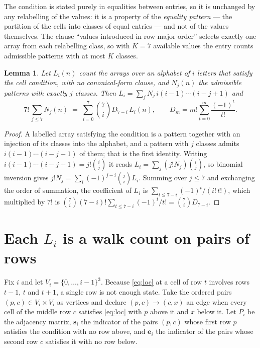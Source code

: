 \documentclass[11pt,a4paper]{article}
\theoremstyle{plain}
\newtheorem{lemma}[theorem]{Lemma}
\theoremstyle{definition}
\begin{document}
The condition is stated purely in equalities between entries, so it is unchanged by any
relabelling of the values: it is a property of the \emph{equality pattern} --- the partition
of the cells into classes of equal entries --- and not of the values themselves. The clause
``values introduced in row major order'' selects exactly one array from each relabelling
class, so with $K=7$ available values the entry counts admissible patterns with at most $K$
classes.

\begin{lemma}\label{lem:inv}
Let $L_i(n)$ count the arrays over an alphabet of $i$ letters that satisfy the cell
condition, with no canonical-form clause, and $N_j(n)$ the admissible patterns with exactly
$j$ classes. Then $L_i=\sum_j N_j\,i(i-1)\cdots(i-j+1)$ and
\[
7!\,\sum_{j\le 7}N_j(n)\;=\;\sum_{i=0}^{7}\binom{7}{i}D_{7-i}\,L_i(n),
\qquad D_m=m!\sum_{t=0}^{m}\frac{(-1)^t}{t!} .
\]
\end{lemma}

\begin{proof}
A labelled array satisfying the condition is a pattern together with an injection of its
classes into the alphabet, and a pattern with $j$ classes admits $i(i-1)\cdots(i-j+1)$ of
them; that is the first identity. Writing $i(i-1)\cdots(i-j+1)=j!\binom{i}{j}$ it reads
$L_i=\sum_j(j!N_j)\binom{i}{j}$, so binomial inversion gives
$j!N_j=\sum_i(-1)^{j-i}\binom{j}{i}L_i$. Summing over $j\le7$ and exchanging the
order of summation, the coefficient of $L_i$ is
$\sum_{t\le7-i}(-1)^t/(i!\,t!)$, which multiplied by $7!$ is
$\binom{7}{i}(7-i)!\sum_{t\le7-i}(-1)^t/t!=\binom{7}{i}D_{7-i}$.
\end{proof}

\section{Each $L_i$ is a walk count on pairs of rows}

Fix $i$ and let $V_i=\{0,\dots,i-1\}^{3}$. Because \eqref{eq:loc} at a cell of row
$t$ involves rows $t-1$, $t$ and $t+1$, a single row is not enough state. Take the
ordered pairs $(p,c)\in V_i\times V_i$ as vertices and declare $(p,c)\to(c,x)$ an edge when
every cell of the middle row $c$ satisfies \eqref{eq:loc} with $p$ above it and $x$
below it. Let $P_i$ be the adjacency matrix, $\mathbf{s}_i$ the indicator of the pairs
$(p,c)$ whose first row $p$ satisfies the condition with no row above, and
$\mathbf{e}_i$ the indicator of the pairs whose second row $c$ satisfies it with no
row below.
\end{document}
